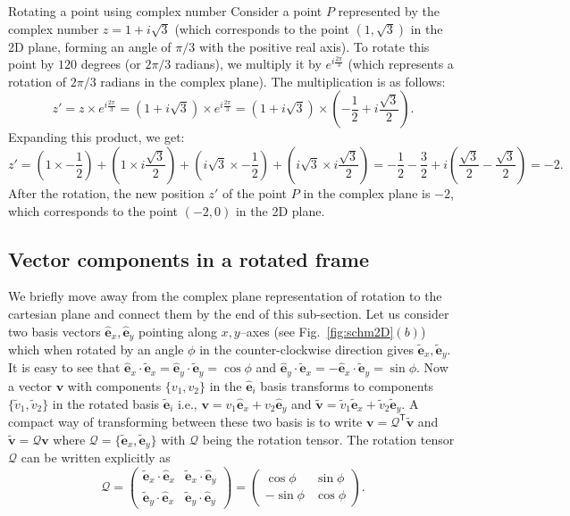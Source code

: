 \documentclass{article}
\def\eh{\hat{\mathbf{e}}}
\def\et{\tilde{\mathbf{e}}}
\def\ehx{\hat{\mathbf{e}}_x}
\def\ehy{\hat{\mathbf{e}}_y}
\def\etx{\tilde{\mathbf{e}}_x}
\def\ety{\tilde{\mathbf{e}}_y}
\def\v{\mathbf{v}}
\def\vt{\tilde{\mathbf{v}}}
\def\vts{\tilde{v}}
\def\Q{\mathcal{Q}}
\def\T{\mathsf{T}}
\begin{document}
\begin{egsBox}[label={egs:rot2Dex1}, float, floatplacement=t]{Rotating a point using complex number}
  \footnotesize
  Consider a point $P$ represented by the complex number $z = 1 + i\sqrt{3}$ (which corresponds to the point $(1, \sqrt{3})$ in the 2D plane, forming an angle of ${\pi}/{3}$ with the positive real axis). To rotate this point by $120$ degrees (or ${2\pi}/{3}$ radians), we multiply it by $e^{i\frac{2\pi}{3}}$ (which represents a rotation of ${2\pi}/{3}$ radians in the complex plane).
  The multiplication is as follows:
  \[
  z' = z \times e^{i\frac{2\pi}{3}} = (1 + i\sqrt{3}) \times e^{i\frac{2\pi}{3}} = (1 + i\sqrt{3}) \times \left(-\frac{1}{2} + i\frac{\sqrt{3}}{2}\right).
  \]
  Expanding this product, we get:
  \[
  z' = \left(1 \times -\frac{1}{2}\right) + \left(1 \times i\frac{\sqrt{3}}{2}\right) + \left(i\sqrt{3} \times -\frac{1}{2}\right) + \left(i\sqrt{3} \times i\frac{\sqrt{3}}{2}\right) = -\frac{1}{2} - \frac{3}{2} + i\left(\frac{\sqrt{3}}{2} - \frac{\sqrt{3}}{2}\right) = -2.
  \]
  After the rotation, the new position $z'$ of the point $P$ in the complex plane is $-2$, which corresponds to the point $(-2, 0)$ in the 2D plane.
\end{egsBox}

\subsection{Vector components in a rotated frame}\label{sec:VecComp2D}
We briefly move away from the complex plane representation of rotation to the cartesian plane and connect them by the end of this sub-section. Let us consider two basis vectors $\ehx, \ehy$ pointing along $x, y$--axes (see Fig.~\ref{fig:schm2D}$(b)$) which when rotated by an angle $\phi$ in the counter-clockwise direction gives $\etx, \ety$. It is easy to see that $\ehx\cdot\etx=\ehy\cdot\ety=\cos \phi$ and $\ehy\cdot\etx = -\ehx\cdot\ety = \sin \phi$. Now a vector $\v$ with components $\{ v_1, v_2 \}$ in the $\eh_i$ basis transforms to components $\{ \vts_1, \vts_2 \}$ in the rotated basis $\et_i$ i.e., $\v = v_1 \ehx + v_2 \ehy$ and $\vt = \vts_1 \etx + \vts_2 \ety$. A compact way of transforming between these two basis is to write $\v = \Q^\T \vt$ and $\vt = \Q \v$ where $\Q = \{ \etx, \ety \}$ with $\Q$ being the rotation tensor. The rotation tensor $\Q$ can be written explicitly as
\[
  \Q  = \begin{pmatrix} 
  \etx \cdot \ehx & \etx \cdot \ehy \\
  \ety \cdot \ehx & \ety\cdot \ehy
  \end{pmatrix} = 
  \begin{pmatrix} 
  \cos \phi & \sin \phi \\
  -\sin \phi & \cos \phi 
  \end{pmatrix}.
\]
\end{document}
